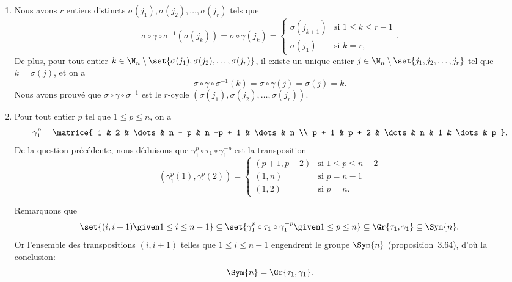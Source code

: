 \begin{enumerate}
  \item
    Nous avons $r$ entiers distincts $\sigma(j_1), \sigma(j_2), \dots, \sigma(j_r)$ tels que
    \[
      \sigma\circ\gamma\circ\sigma^{-1} (\sigma(j_k))
        = \sigma\circ\gamma(j_k)
        = \begin{cases}
            \sigma(j_{k + 1})  & \text{si $1\leq k \leq r - 1$} \\
            \sigma(j_1) & \text{si $k = r$},
          \end{cases}.
    \]
    De plus, pour tout entier $k\in\N_n\setminus\set{\sigma(j_1), \sigma(j_2), \dots, \sigma(j_r)}$, il existe un unique entier $j\in\N_n\setminus\set{j_1, j_2, \dots, j_r}$ tel que $k = \sigma(j)$, et on a
    \[
      \sigma\circ\gamma\circ\sigma^{-1}(k) = \sigma\circ\gamma(j) = \sigma(j) = k.
    \]
    Nous avons prouvé que $\sigma\circ\gamma\circ\sigma^{-1}$ est le $r$-cycle $(\sigma(j_1), \sigma(j_2), \dots, \sigma(j_r))$.

  \item
    Pour tout entier $p$ tel que $1\leq p\leq n$, on a
    \[
      \gamma_1^p =
        \matrice{
          1 & 2 & \dots & n - p & n -p + 1 & \dots & n \\
          p + 1 & p + 2 & \dots & n & 1 & \dots & p
        }.
    \]
    De la question précédente, nous déduisons que $\gamma_1^p\circ\tau_1\circ\gamma_1^{-p}$ est la transposition
    \[
        (\gamma_1^p(1), \gamma_1^p(2))
        = \begin{cases}
            (p + 1, p + 2) & \text{si $1\leq p\leq n - 2$} \\
            (1, n) & \text{si $p = n - 1$} \\
            (1, 2) & \text{si $p = n$}.
          \end{cases}
    \]

    Remarquons que
    \[
      \set{(i, i + 1)\given 1\leq i\leq n - 1}\subseteq\set{\gamma_1^p\circ\tau_1\circ\gamma_1^{-p}\given 1\leq p\leq n} \subseteq \Gr{\tau_1, \gamma_1}\subseteq\Sym{n}.
    \]
    Or l'ensemble des transpositions $(i, i + 1)$ telles que $1\leq i\leq n - 1$ engendrent le groupe $\Sym{n}$ (proposition~3.64), d'où la conclusion:
    \[
      \Sym{n} = \Gr{\tau_1, \gamma_1}.
    \]
\end{enumerate}
